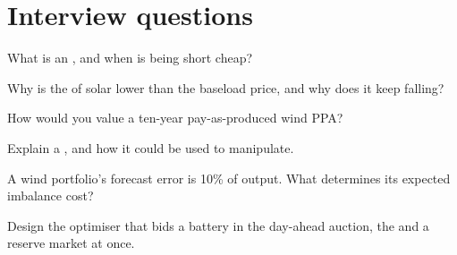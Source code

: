 \section{Interview questions}

\begin{interviewq}\label{iq:m3:power-markets-trading:1}
What is an , and when is being short cheap?
\end{interviewq}

\begin{interviewq}\label{iq:m3:power-markets-trading:2}
Why is the  of solar lower than the baseload price, and why does it keep falling?
\end{interviewq}

\begin{interviewq}\label{iq:m3:power-markets-trading:3}
How would you value a ten-year pay-as-produced wind PPA?
\end{interviewq}

\begin{interviewq}\label{iq:m3:power-markets-trading:4}
Explain a , and how it could be used to manipulate.
\end{interviewq}

\begin{interviewq}\label{iq:m3:power-markets-trading:5}
A wind portfolio's forecast error is 10\% of output. What determines its expected imbalance
cost?
\end{interviewq}

\begin{interviewq}\label{iq:m3:power-markets-trading:6}
Design the optimiser that bids a battery in the day-ahead auction, the  and a
reserve market at once.
\end{interviewq}
